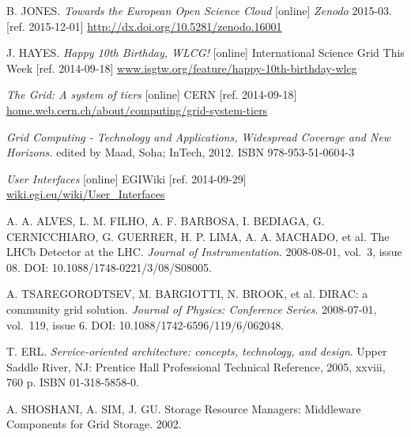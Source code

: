 
\def\bibname{Bibliography}
\begin{thebibliography}{99}
\addcontentsline{toc}{chapter}{\bibname}


	B. JONES.
	\emph{Towards the European Open Science Cloud} [online]
	\textit{Zenodo} 2015-03. [ref. 2015-12-01]
	\url{http://dx.doi.org/10.5281/zenodo.16001}
	

	J. HAYES. 
	\emph{Happy 10th Birthday, WLCG!} [online]
	International Science Grid This Week [ref. 2014-09-18]
	\url{www.isgtw.org/feature/happy-10th-birthday-wlcg}

	\emph{The Grid: A system of tiers} [online] 
	CERN [ref. 2014-09-18]
	\url{home.web.cern.ch/about/computing/grid-system-tiers}

	\emph{Grid Computing - Technology and Applications, Widespread Coverage and New Horizons.} 
	edited by Maad, Soha; InTech, 2012.
	ISBN 978-953-51-0604-3

	\emph{User Interfaces} [online] 
	EGIWiki [ref. 2014-09-29]
	\url{wiki.egi.eu/wiki/User_Interfaces}
	
	A. A. ALVES, L. M. FILHO, A. F. BARBOSA, I. BEDIAGA, G. CERNICCHIARO, G. GUERRER, H. P. LIMA, A. A. MACHADO, et al. 
	The LHCb Detector at the LHC.
	\textit{Journal of Instrumentation}. 
	2008-08-01, vol.~3, issue 08. 
	DOI: 10.1088/1748-0221/3/08/S08005.
	
	A. TSAREGORODTSEV, M. BARGIOTTI, N. BROOK, et al. 
	DIRAC: a community grid solution. 
	\textit{Journal of Physics: Conference Series}. 2008-07-01, vol.~119, issue 6.
	DOI: 10.1088/1742-6596/119/6/062048.
	
	T. ERL. 
	\textit{Service-oriented architecture: concepts, technology, and design}. 
	Upper Saddle River, NJ: Prentice Hall Professional Technical Reference, 2005, xxviii, 
	760 p. ISBN 01-318-5858-0.

	
	A. SHOSHANI,  A. SIM, J. GU. 
	Storage Resource Managers: Middleware Components for Grid Storage. 
	2002.
	

\end{thebibliography}
